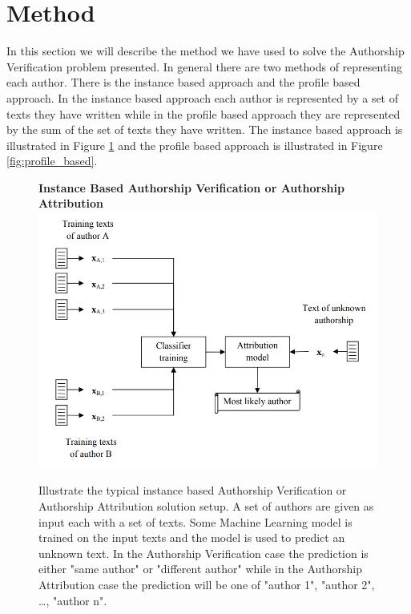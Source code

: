 \section{Method} \label{sec:method} 

In this section we will describe the method we have used to solve the Authorship
Verification problem presented. In general there are two methods of representing
each author. There is the instance based approach and the profile based
approach. In the instance based approach each author is represented by a set of
texts they have written while in the profile based approach they are represented
by the sum of the set of texts they have written. The instance based approach is
illustrated in Figure \ref{fig:instance_based} and the profile based approach is
illustrated in Figure \ref{fig:profile_based}.

\begin{figure}[htb]
    \centering
    \textbf{Instance Based Authorship Verification or Authorship Attribution}
    \includegraphics[scale=0.4]{./pictures/InstanceBased.png}

    \caption{Illustrate the typical instance based Authorship Verification or
        Authorship Attribution solution setup.\cite{stamatos2009} A set of authors are given as
        input each with a set of texts. Some Machine Learning model is trained
        on the input texts and the model is used to predict an unknown text. In
        the Authorship Verification case the prediction is either "same author"
        or "different author" while in the Authorship Attribution case the
        prediction will be one of "author 1", "author 2", \dots, "author n".}

    \label{fig:instance_based}
\end{figure}

